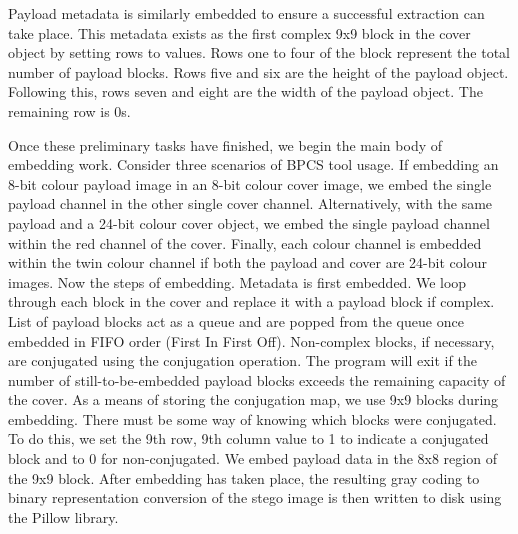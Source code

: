 \documentclass{l4proj}
\begin{document}
Payload metadata is similarly embedded to ensure a successful extraction can take place. This metadata exists as the first complex 9x9 block in the cover object by setting rows to values. Rows one to four of the block represent the total number of payload blocks. Rows five and six are the height of the payload object.  Following this, rows seven and eight are the width of the payload object. The remaining row is 0s. 

Once these preliminary tasks have finished, we begin the main body of embedding work. Consider three scenarios of BPCS tool usage. If embedding an 8-bit colour payload image in an 8-bit colour cover image, we embed the single payload channel in the other single cover channel. Alternatively, with the same payload and a 24-bit colour cover object, we embed the single payload channel within the red channel of the cover. Finally, each colour channel is embedded within the twin colour channel if both the payload and cover are 24-bit colour images. Now the steps of embedding. Metadata is first embedded. We loop through each block in the cover and replace it with a payload block if complex. List of payload blocks act as a queue and are popped from the queue once embedded in FIFO order (First In First Off). Non-complex blocks, if necessary, are conjugated using the conjugation operation.  The program will exit if the number of still-to-be-embedded payload blocks exceeds the remaining capacity of the cover. As a means of storing the conjugation map, we use 9x9 blocks during embedding. There must be some way of knowing which blocks were conjugated. To do this, we set the 9th row, 9th column value to 1 to indicate a conjugated block and to 0 for non-conjugated. We embed payload data in the 8x8 region of the 9x9 block. After embedding has taken place, the resulting gray coding to binary representation conversion of the stego image is then written to disk using the Pillow library. 
\end{document}

